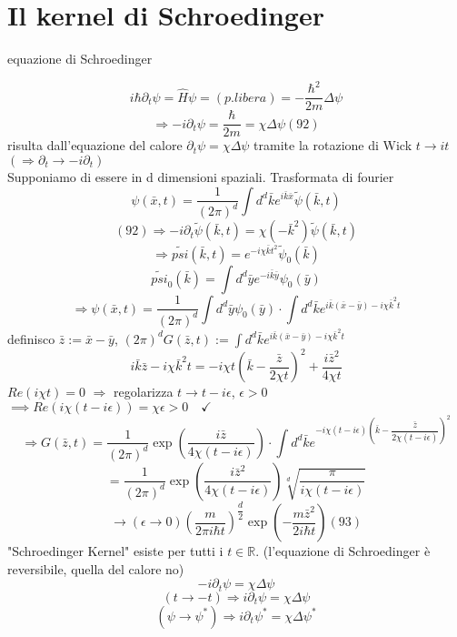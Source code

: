 \documentclass[a4paper,11pt]{report}
\newcommand{\R}{\mathbb{R}}
\newcommand{\x}{\bar{x}}
\newcommand{\y}{\bar{y}}
\newcommand{\kk}{\bar{k}}
\newcommand{\z}{\bar{z}}
\begin{document}

\section{Il kernel di Schroedinger}

equazione di Schroedinger

$$
i\hbar \partial_t \psi = \hat{H}\psi =(p. libera)= -\dfrac{\hbar^2}{2m}\Delta \psi 
$$
\begin{equation}
\Rightarrow -i\partial_t \psi =\dfrac{\hbar}{2m}=\chi \Delta \psi (92)
\end{equation}
risulta dall'equazione del calore $\partial_t \psi =\chi \Delta \psi$ tramite la rotazione di Wick $t \rightarrow it$ $(\Rightarrow \partial _t \rightarrow -i\partial_t)$\\
Supponiamo di essere in d dimensioni spaziali. Trasformata di fourier
$$
\psi(\x,t)=\dfrac{1}{(2\pi)^d}\int d^d\kk e^{i\kk \x}\tilde{\psi}(\kk,t)
$$
$$
(92)\Rightarrow -i\partial_t \tilde{\psi}(\kk,t)=\chi (-\kk ^2)\tilde{\psi}(\kk,t)
$$
$$
\Rightarrow \tilde{psi}(\kk,t) = e^{-i\chi\kk t^2}\tilde{\psi}_0(\kk)
$$
$$
\tilde{psi}_0(\kk) = \int d^d \y e^{-i\kk \y} \psi_0(\y)
$$
$$
\Rightarrow \psi(\x,t) = \dfrac{1}{(2\pi)^d}\int d^d \y \psi_0(\y) \cdot \int d^d\kk e^{i\kk(\x-\y) - i\chi \kk^2 t}
$$
definisco $\z :=\x - \y$, \quad $(2\pi)^d G(\z,t) :=\int d^d\kk e^{i\kk(\x-\y) - i\chi \kk^2 t}$
$$
i\kk \z - i \chi \kk^2 t = -i\chi t\left(\kk - \dfrac{\z}{2\chi t}\right)^2 + \dfrac{i\z^2}{4\chi t}
$$
$Re(i\chi t)=0$ $\Rightarrow$ regolarizza $t\rightarrow t-i\epsilon$, $\epsilon>0$ $\implies Re(i\chi(t-i\epsilon))=\chi\epsilon >0 \quad \checkmark$
$$
\Rightarrow G(\z,t)=\dfrac{1}{(2\pi)^d}\exp \left(\dfrac{i\z}{4\chi(t-i\epsilon)}\right)\cdot \int d^d\kk e^{-i\chi(t-i\epsilon)\left( \kk -\dfrac{\z}{2\chi(t-i\epsilon)}\right)^2}
$$
$$
=\dfrac{1}{(2\pi)^d}\exp\left(\dfrac{i\z^2}{4\chi(t-i\epsilon)}\right)\sqrt[d]{\dfrac{\pi}{i\chi(t-i\epsilon)}}
$$
\begin{equation}
\rightarrow (\epsilon \to 0) \left(\dfrac{m}{2\pi i \hbar t}\right)^{\dfrac{d}{2}}\exp \left(-\dfrac{m\z^2}{2i\hbar t}  \right) (93)
\end{equation}
"Schroedinger Kernel" esiste per tutti i $t\in \R$. (l'equazione di Schroedinger è reversibile, quella del calore no)
$$
-i\partial_t \psi =\chi \Delta \psi
$$
$$
(t\to -t)\Rightarrow i\partial_t\psi=\chi\Delta \psi
$$
$$
(\psi \to \psi^*)\Rightarrow i\partial_t\psi^*=\chi\Delta \psi^*
$$
\end{document}
